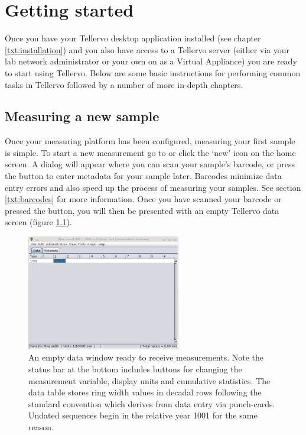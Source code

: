 
\chapter{Getting started}
\label{txt:gettingstarted}

Once you have your Tellervo desktop application installed (see chapter \ref{txt:installation}) and you also have access to a Tellervo server (either via your lab network administrator or your own on as a Virtual Appliance) you are ready to start using Tellervo.  Below are some basic instructions for performing common tasks in Tellervo followed by a number of more in-depth chapters.

\section{Measuring a new sample}
Once your measuring platform has been configured, measuring your first sample is simple.  To start a new measurement go to  or click the `new' icon on the home screen. A dialog will appear where you can scan your sample's barcode, or press the button to enter metadata for your sample later. Barcodes minimize data entry errors and also speed up the process of measuring your samples. See section \ref{txt:barcodes} for more information. Once you have scanned your barcode or pressed the button, you will then be presented with an empty Tellervo data screen (figure \ref{fig:datascreen}).

\begin{figure}[hbtp]
  \centering
    \includegraphics[width=0.6\textwidth]{Images/datascreen.png}
    \caption{An empty data window ready to receive measurements.  Note the status bar at the bottom includes buttons for changing the measurement variable, display units and cumulative statistics.  The data table stores ring width values in decadal rows following the standard convention which derives from data entry via punch-cards.  Undated sequences begin in the relative year 1001 for the same reason.}
    \label{fig:datascreen}
\end{figure}


